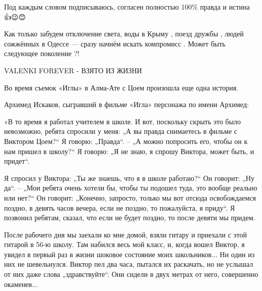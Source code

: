 \begin{itemize}
 
Под каждым словом подписываюсь, согласен полностью 100\% правда и истина 👍😉😊

 

Как только забудем отключение света, воды в Крыму , поезд дружбы , людей
сожжённых в Одессе — сразу начнём искать компромисс . Может быть следующее
поколение ?!

 

VALENKI FOREVER - ВЗЯТО ИЗ ЖИЗНИ

Во время съемок «Иглы» в Алма-Ате с Цоем произошла еще одна история.

Архимед Искаков, сыгравший в фильме «Игла» персонажа по имени Архимед:

«В то время я работал учителем в школе. И вот, поскольку скрыть это было
невозможно, ребята спросили у меня: „А вы правда снимаетесь в фильме с Виктором
Цоем?“ Я говорю: „Правда“. – „А можно попросить его, чтобы он к нам пришел в
школу?“ Я говорю: „Я не знаю, я спрошу Виктора, может быть, и придет“.

Я спросил у Виктора: „Ты же знаешь, что я в школе работаю?“ Он говорит: „Ну
да“. – „Мои ребята очень хотели бы, чтобы ты подошел туда, это вообще реально
или нет?“ Он говорит: „Конечно, запросто, только мы вот отсюда освобождаемся
поздно, в девять часов вечера, если не поздно, то пожалуйста, я приду“. Я
позвонил ребятам, сказал, что если не будет поздно, то после девяти мы придем.

После рабочего дня мы заехали ко мне домой, взяли гитару и приехали с этой
гитарой в 56-ю школу. Там набился весь мой класс, и, когда вошел Виктор, я
увидел в первый раз в жизни шоковое состояние моих школьников... Ни один из них
не шевельнулся. Виктор пел два часа, пытался их раскачать, но не услышал от них
даже слова „здравствуйте“. Они сидели в двух метрах от него, совершенно
окаменев...


\end{itemize}
